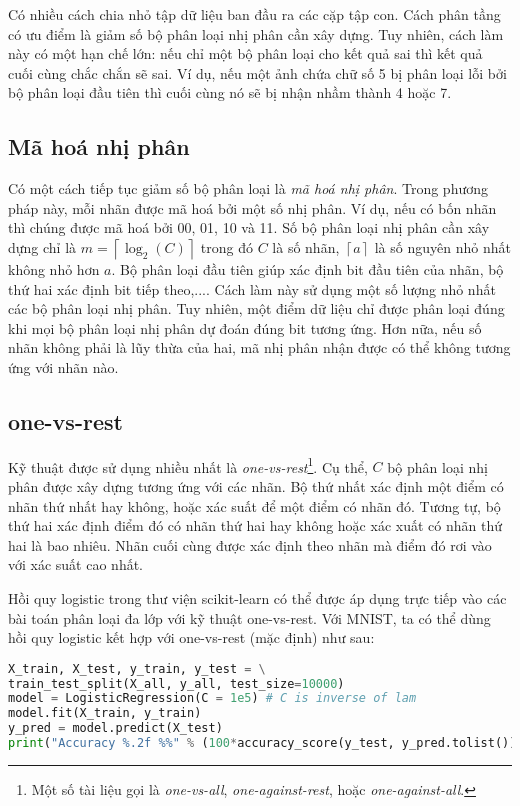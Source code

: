 Có nhiều cách chia nhỏ tập dữ liệu ban đầu ra các cặp tập con. Cách phân tầng có ưu điểm là giảm số bộ phân loại nhị phân cần xây dựng. Tuy nhiên, cách làm này có một hạn chế lớn: nếu chỉ một bộ phân loại cho kết quả sai thì kết quả cuối cùng chắc chắn sẽ sai. Ví dụ, nếu một ảnh chứa chữ
số {5} bị phân loại lỗi bởi bộ phân loại đầu tiên thì cuối cùng nó sẽ bị nhận nhầm thành 4 hoặc 7.


\subsection{Mã hoá nhị phân}
Có một cách tiếp tục giảm số bộ phân loại là \textit{mã hoá nhị phân}. Trong phương pháp này, mỗi nhãn được mã hoá bởi một số nhị phân. Ví dụ, nếu có bốn nhãn thì chúng được mã hoá bởi 00, 01, 10 và 11. Số bộ phân loại nhị phân cần xây dựng chỉ là $m =
\left\lceil\log_2(C)\right\rceil$ trong đó $C$ là số nhãn, $\left\lceil a
\right\rceil$ là {số nguyên nhỏ nhất không nhỏ hơn} $a$. Bộ phân loại đầu tiên giúp xác định bit đầu tiên của nhãn, bộ thứ hai xác định bit tiếp theo,....
Cách làm này sử dụng một số lượng nhỏ nhất các bộ phân loại nhị phân. Tuy
nhiên, một điểm dữ liệu chỉ được phân loại đúng khi mọi bộ phân loại nhị phân dự đoán đúng bit tương ứng. Hơn nữa, nếu số nhãn không phải là lũy thừa của hai,
mã nhị phân nhận được có thể không tương ứng với nhãn nào.


\subsection{one-vs-rest}
Kỹ thuật được sử dụng nhiều nhất là \textit{one-vs-rest}\footnote{Một số tài
liệu gọi là \textit{one-vs-all}, \textit{one-against-rest}, hoặc
\textit{one-against-all}.}. Cụ thể, $C$ bộ phân loại nhị phân được xây dựng
tương ứng với các nhãn. Bộ thứ nhất xác định một điểm có nhãn thứ nhất hay
không, hoặc xác suất để một điểm có nhãn đó. Tương tự, bộ thứ hai xác định điểm
đó có nhãn thứ hai hay không hoặc xác xuất có nhãn thứ hai là bao nhiêu. Nhãn
cuối cùng được xác định theo nhãn mà điểm đó rơi vào với xác suất cao nhất.



Hồi quy logistic trong thư viện scikit-learn có thể được áp dụng trực tiếp
vào các bài toán phân loại đa lớp với kỹ thuật {one-vs-rest}. Với MNIST, ta có thể dùng hồi quy logistic kết hợp với one-vs-rest (mặc định) như sau:
\begin{lstlisting}[language=Python]
X_train, X_test, y_train, y_test = \
train_test_split(X_all, y_all, test_size=10000)
model = LogisticRegression(C = 1e5) # C is inverse of lam
model.fit(X_train, y_train)
y_pred = model.predict(X_test)
print("Accuracy %.2f %%" % (100*accuracy_score(y_test, y_pred.tolist())))
\end{lstlisting}

